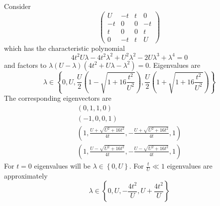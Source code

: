 \documentclass{article}
\begin{document}
Consider
\[\begin{pmatrix}
  U & -t & t & 0 \\
  -t & 0 & 0 & -t \\
  t & 0 & 0 & t \\
  0 & -t & t & U
 \end{pmatrix}\]
 which has the characteristic polynomial
\[4 t^2 U \lambda - 4 t^2 \lambda^2 + U^2 \lambda^2 - 2 U \lambda^3 + \lambda^4 =0\]
and factors to $\lambda (U - \lambda) (4 t^2 + U \lambda - \lambda^2)=0$.
Eigenvalues are \[\lambda \in \left\{0,U,\frac{U}{2}\left(1-\sqrt{1+16\frac{t^2}{U^2}}\right),\frac{U}{2}\left(1+\sqrt{1+16\frac{t^2}{U^2}}\right)\right\}\]
The corresponding eigenvectors are 
\[\begin{matrix}
(0,1,1,0)\\
(-1,0,0,1)\\
\left(1,\frac{U+\sqrt{U^2+16t^2}}{4t},-\frac{U+\sqrt{U^2+16t^2}}{4t},1\right)\\
\left(1,\frac{U-\sqrt{U^2+16t^2}}{4t},-\frac{U-\sqrt{U^2+16t^2}}{4t},1\right)
\end{matrix}\]
For $t=0$ eigenvalues will be $\lambda \in \left\{0,U\right\}$.
For $\frac{t}{U}\ll 1$
eigenvalues are approximately\[\lambda \in \left\{0,U,-\frac{4t^2}{U},U+\frac{4t^2}{U}\right\}\]
\end{document}

